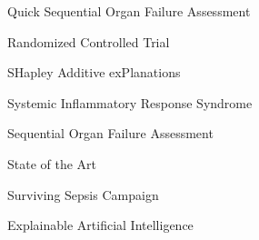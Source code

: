 \documentclass[11pt,a4paper]{article}
\begin{document}
\begin{description}[leftmargin=3.5cm,style=nextline]
    \item[qSOFA] Quick Sequential Organ Failure Assessment
    \item[RCT] Randomized Controlled Trial
    \item[SHAP] SHapley Additive exPlanations
    \item[SIRS] Systemic Inflammatory Response Syndrome
    \item[SOFA] Sequential Organ Failure Assessment
    \item[SOTA] State of the Art
    \item[SSC] Surviving Sepsis Campaign
    \item[XAI] Explainable Artificial Intelligence
\end{description}

\FloatBarrier



\end{document}
